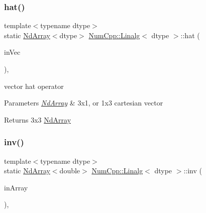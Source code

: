 \subsubsection{\texorpdfstring{hat()}{hat()}\hspace{0.1cm}{\footnotesize\ttfamily [2/2]}}
{\footnotesize\ttfamily template$<$typename dtype$>$ \\
static \mbox{\hyperlink{class_num_cpp_1_1_nd_array}{Nd\+Array}}$<$dtype$>$ \mbox{\hyperlink{class_num_cpp_1_1_linalg}{Num\+Cpp\+::\+Linalg}}$<$ dtype $>$\+::hat (\begin{DoxyParamCaption}\item[{const \mbox{\hyperlink{class_num_cpp_1_1_nd_array}{Nd\+Array}}$<$ dtype $>$ \&}]{in\+Vec }\end{DoxyParamCaption})\hspace{0.3cm}{\ttfamily [inline]}, {\ttfamily [static]}}

vector hat operator


\begin{DoxyParams}{Parameters}
{\em \mbox{\hyperlink{class_num_cpp_1_1_nd_array}{Nd\+Array}}} & 3x1, or 1x3 cartesian vector \\
\hline
\end{DoxyParams}
\begin{DoxyReturn}{Returns}
3x3 \mbox{\hyperlink{class_num_cpp_1_1_nd_array}{Nd\+Array}} 
\end{DoxyReturn}
\mbox{\label{class_num_cpp_1_1_linalg_ab800e3d60c0290b5355fc2caa71f3365}} 
\subsubsection{\texorpdfstring{inv()}{inv()}}
{\footnotesize\ttfamily template$<$typename dtype$>$ \\
static \mbox{\hyperlink{class_num_cpp_1_1_nd_array}{Nd\+Array}}$<$double$>$ \mbox{\hyperlink{class_num_cpp_1_1_linalg}{Num\+Cpp\+::\+Linalg}}$<$ dtype $>$\+::inv (\begin{DoxyParamCaption}\item[{const \mbox{\hyperlink{class_num_cpp_1_1_nd_array}{Nd\+Array}}$<$ dtype $>$ \&}]{in\+Array }\end{DoxyParamCaption})\hspace{0.3cm}{\ttfamily [inline]}, {\ttfamily [static]}}

